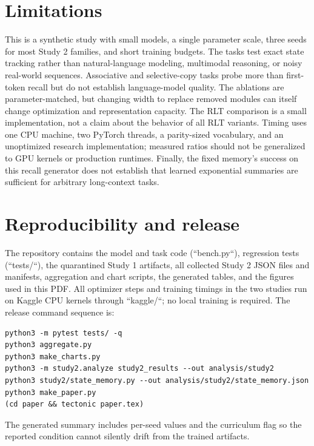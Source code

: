 \documentclass{article}
\begin{document}
\section{Limitations}
This is a synthetic study with small models, a single parameter scale, three
seeds for most Study 2 families, and short training budgets. The tasks test
exact state tracking rather than natural-language modeling, multimodal
reasoning, or noisy real-world sequences. Associative and selective-copy
tasks probe more than first-token recall but do not establish language-model
quality. The ablations are parameter-matched, but changing width to replace
removed modules can itself change optimization and representation capacity.
The RLT comparison is a small implementation, not a claim about the behavior
of all RLT variants. Timing uses one CPU machine, two PyTorch threads, a
parity-sized vocabulary, and an unoptimized research implementation; measured
ratios should not be generalized to GPU kernels or production runtimes.
Finally, the fixed memory's success on this recall generator does not establish
that learned exponential summaries are sufficient for arbitrary long-context
tasks.

\section{Reproducibility and release}
The repository contains the model and task code (``bench.py``), regression
tests (``tests/``), the quarantined Study 1 artifacts, all collected Study 2
JSON files and manifests, aggregation and chart scripts, the generated tables,
and the figures used in this PDF. All optimizer steps and training timings in
the two studies run on Kaggle CPU kernels through ``kaggle/``; no local
training is required.
The release command sequence is:
\begin{verbatim}
python3 -m pytest tests/ -q
python3 aggregate.py
python3 make_charts.py
python3 -m study2.analyze study2_results --out analysis/study2
python3 study2/state_memory.py --out analysis/study2/state_memory.json
python3 make_paper.py
(cd paper && tectonic paper.tex)
\end{verbatim}
The generated summary includes per-seed values and the curriculum flag so the
reported condition cannot silently drift from the trained artifacts.
\end{document}
